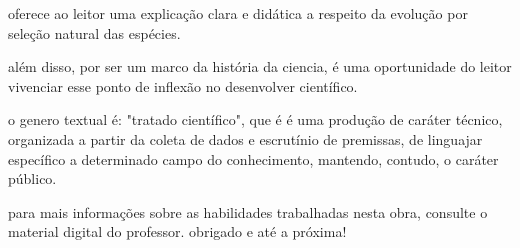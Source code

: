 oferece ao leitor uma explicação clara e didática a respeito da evolução por seleção natural das espécies.

além disso,  por ser um marco da história da ciencia, 
é uma oportunidade do leitor vivenciar esse ponto de inflexão no desenvolver científico.


o genero textual  é: "tratado científico",   que é  é uma produção de caráter técnico,  organizada a partir da coleta de dados e escrutínio de premissas, de linguajar específico a determinado campo do conhecimento,  mantendo, contudo, o caráter público.




para mais informações sobre as habilidades trabalhadas nesta obra, consulte o material digital do professor. obrigado e até a próxima!

